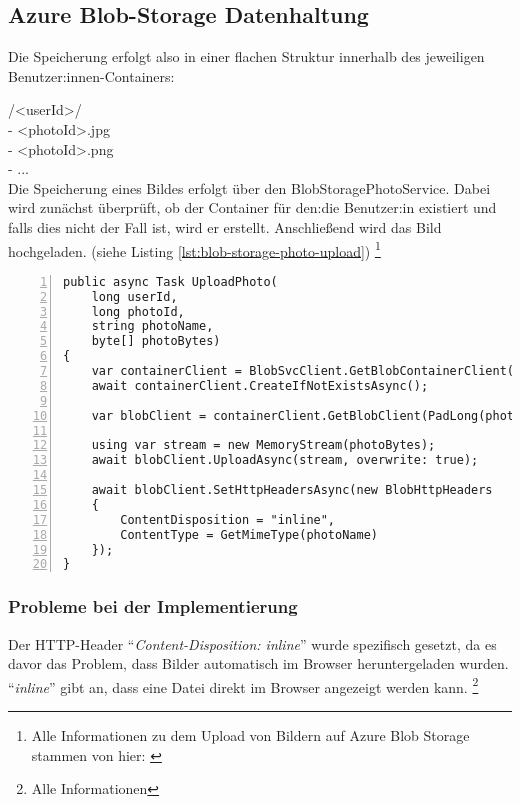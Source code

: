 \subsection{Azure Blob-Storage Datenhaltung}
\label{subsection:azure_blob_storage_datamodel}

Die Speicherung erfolgt also in einer flachen Struktur innerhalb des 
jeweiligen Benutzer:innen-Containers:

/<userId>/\\
 - <photoId>.jpg\\
 - <photoId>.png\\
 - ...\\

Die Speicherung eines Bildes erfolgt über den BlobStoragePhotoService. 
Dabei wird zunächst überprüft, ob der Container für den:die Benutzer:in existiert und falls dies 
nicht der Fall ist, wird er erstellt. Anschlie\ss{}end wird das Bild hochgeladen.
(siehe Listing \ref{lst:blob-storage-photo-upload})
\footnote{Alle Informationen zu dem Upload von Bildern auf Azure Blob Storage stammen von hier: \cite{MicrosoftCorporationac}}

\begin{lstlisting}[numbers=left,caption={Foto Upload auf den Blob-Storage},label={lst:blob-storage-photo-upload}]
public async Task UploadPhoto(
    long userId, 
    long photoId, 
    string photoName, 
    byte[] photoBytes)
{
    var containerClient = BlobSvcClient.GetBlobContainerClient(PadLong(userId));
    await containerClient.CreateIfNotExistsAsync();
    
    var blobClient = containerClient.GetBlobClient(PadLong(photoId) + GetExtension(photoName));
    
    using var stream = new MemoryStream(photoBytes);
    await blobClient.UploadAsync(stream, overwrite: true);
    
    await blobClient.SetHttpHeadersAsync(new BlobHttpHeaders
    {
        ContentDisposition = "inline",
        ContentType = GetMimeType(photoName)
    });
}    
\end{lstlisting}

\subsubsection{Probleme bei der Implementierung}

Der HTTP-Header ``\emph{Content-Disposition: inline}'' wurde spezifisch gesetzt,
da es davor das Problem, dass Bilder automatisch im Browser heruntergeladen wurden.
``\emph{inline}'' gibt an, dass eine Datei direkt im Browser angezeigt werden kann.
\footnote{Alle Informationen}

